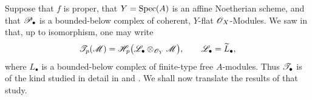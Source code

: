 \begin{env}[7.7.4]
\label{III.7.7.4}
Suppose that $f$ is proper, that $Y=\operatorname{Spec}(A)$ is an affine
Noetherian scheme, and that $\mathscr{P}_\bullet$ is a
bounded-below complex of coherent, $Y$-flat
$\mathscr{O}_X$-Modules.  We saw in  that, up to
isomorphism, one may write
\[
  \mathscr{T}_p(\mathscr{M})
  =
  \mathscr{H}_p
    \bigl(\mathscr{L}_\bullet
      \otimes_{\mathscr{O}_Y}\mathscr{M}\bigr),
  \qquad
  \mathscr{L}_\bullet=\widetilde{L}_\bullet,
\]
where $L_\bullet$ is a bounded-below complex of
finite-type free $A$-modules.  Thus
$\mathscr{T}_\bullet$ is of the kind studied in detail in
 and .  We shall now translate
the results of that study.
\end{env}

\ifdefined\EGAIIIStopAfterPageOneNineNine
  \expandafter\endinput
\fi

\egaIIISubsectionSevenSevenTheorems

